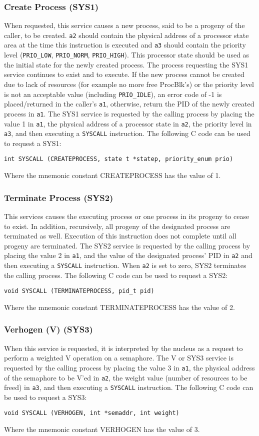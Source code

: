 \subsubsection{Create Process (SYS1)}
When requested, this service causes a new process, said to be a progeny of the
caller, to be created. \verb+a2+ should contain the physical address of a processor state
area at the time this instruction is executed and \verb+a3+ should contain
the priority level (\verb+PRIO_LOW+, \verb+PRIO_NORM+, \verb+PRIO_HIGH+). 
This processor state should be used
as the initial state for the newly created process. The process requesting the SYS1
service continues to exist and to execute. If the new process cannot be created due
to lack of resources (for example no more free ProcBlk's) or the priority level is not an acceptable value (including \verb+PRIO_IDLE+), an error code of
-1 is placed/returned in the caller's \verb+a1+, otherwise, return the PID
of the newly created process in \verb+a1+.
The SYS1 service is requested by the calling process by placing the value
1 in \verb+a1+, the physical address of a processor state in \verb+a2+, the priority level in \verb+a3+, and then executing a
\verb+SYSCALL+ instruction.
The following C code can be used to request a SYS1:
\begin{verbatim}
int SYSCALL (CREATEPROCESS, state t *statep, priority_enum prio)
\end{verbatim}
	Where the mnemonic constant CREATEPROCESS has the value of 1.
\subsubsection{Terminate Process (SYS2)}
This services causes the executing process or one process in its progeny to cease to exist. 
In addition, recursively, 
all progeny of the designated process are terminated as well. 
Execution of this instruction does not complete until all progeny are terminated.
The SYS2 service is requested by the calling process by placing the value 2 in
\verb+a1+, and the value of the designated process' PID in \verb+a2+ and
then executing a \verb+SYSCALL+ instruction.
When \verb+a2+ is set to zero, SYS2 terminates the calling process.
The following C code can be used to request a SYS2:
\begin{verbatim}
void SYSCALL (TERMINATEPROCESS, pid_t pid)
\end{verbatim}
Where the mnemonic constant TERMINATEPROCESS has the value of 2.
\subsubsection{Verhogen (V) (SYS3)}
When this service is requested, it is interpreted by the nucleus as a request to
perform a weighted V operation on a semaphore.
The V or SYS3 service is requested by the calling process by placing the value
3 in \verb+a1+, the physical address of the semaphore to be V'ed in \verb+a2+, 
the weight value (number of resources to be freed) in \verb+a3+, and then executing
a \verb+SYSCALL+ instruction.
The following C code can be used to request a SYS3:
\begin{verbatim}
void SYSCALL (VERHOGEN, int *semaddr, int weight)
\end{verbatim}
Where the mnemonic constant VERHOGEN has the value of 3.
